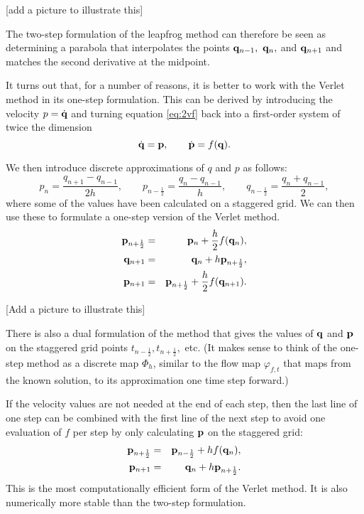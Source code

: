 [add a picture to illustrate this]

The two-step formulation of the leapfrog method can therefore be seen as determining a parabola that interpolates the points ${\bf q}_{n-1},~{\bf q}_{n},$ and ${\bf q}_{n+1}$ and matches the second derivative at the midpoint.

It turns out that, for a number of reasons, it is better to work with the Verlet method in its one-step formulation. This can be derived by introducing the velocity $p=\dot{\bf q}$ and turning equation \ref{eq:2vf} back into a first-order system of twice the dimension
$$
	\dot{\bf q} = {\bf p},\qquad \dot{\bf p} = f({\bf q}).
$$

We then introduce discrete approximations of $q$ and $p$ as follows:
$$
p_n =\frac{q_{n+1}-q_{n-1}}{2h},\qquad p_{n-\frac12} = \frac{q_n-q_{n-1}}{h}, \qquad q_{n-\frac12} = \frac{q_n + q_{n-1}}{2},
$$
where some of the values have been calculated on a staggered grid. We can then use these to formulate a one-step version of the Verlet method. 
\begin{eqnarray*}
	{\bf p}_{n+\frac12} &=& {\bf p}_n+\frac{h}{2}f({\bf q}_n),\\
	{\bf q}_{n+1} &=& {\bf q}_n +h{\bf p}_{n+\frac12},\\
	{\bf p}_{n+1} &=& {\bf p}_{n+\frac12}+\frac{h}{2}f({\bf q}_{n+1}).
\end{eqnarray*}

[Add a picture to illustrate this]

There is also a dual formulation of the method that gives the values of ${\bf q}$ and ${\bf p}$ on the staggered grid points $t_{n-\frac12},t_{n+\frac12},$ etc.
(It makes sense to think of the one-step method as a discrete map $\Phi_h$, similar to the flow map $\varphi_{f,t}$ that maps from the known solution, to its approximation one time step forward.)

If the velocity values are not needed at the end of each step, then the last line of one step can be combined with the first line of the next step to avoid one evaluation of $f$ per step by only calculating ${\bf p}$ on the staggered grid:
\begin{eqnarray*}
	{\bf p}_{n+\frac12} &=& {\bf p}_{n-\frac12}+hf({\bf q}_n),\\
	{\bf p}_{n+1} &=& {\bf q}_n +h{\bf p}_{n+\frac12}.
\end{eqnarray*}
This is the most computationally efficient form of the Verlet method. It is also numerically more stable than the two-step formulation.

